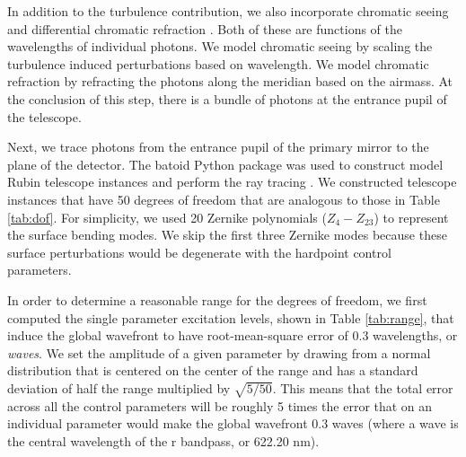 In addition to the turbulence contribution, we also incorporate chromatic seeing and differential chromatic refraction \cite{chromatic}. Both of these are functions of the wavelengths of individual photons. We model chromatic seeing by scaling the turbulence induced perturbations based on wavelength. We model chromatic refraction by refracting the photons along the meridian based on the airmass. At the conclusion of this step, there is a bundle of photons at the entrance pupil of the telescope.

Next, we trace photons from the entrance pupil of the primary mirror to the plane of the detector. The batoid Python package was used to construct model Rubin telescope instances and perform the ray tracing \cite{batoid}. We constructed telescope instances that have 50 degrees of freedom that are analogous to those in Table \ref{tab:dof}. For simplicity, we used 20 Zernike polynomials ($Z_4 - Z_{23}$) to represent the surface bending modes. We skip the first three Zernike modes because these surface perturbations would be degenerate with the hardpoint control parameters.

In order to determine a reasonable range for the degrees of freedom, we first computed the single parameter excitation levels, shown in Table \ref{tab:range}, that induce the global wavefront to have root-mean-square error of 0.3 wavelengths, or \textit{waves}. We set the amplitude of a given parameter by drawing from a normal distribution that is centered on the center of the range and has a standard deviation of half the range multiplied by $\sqrt{5/50}$. This means that the total error across all the control parameters will be roughly 5 times the error that on an individual parameter would make the global wavefront 0.3 waves (where a wave is the central wavelength of the r bandpass, or 622.20 nm).

